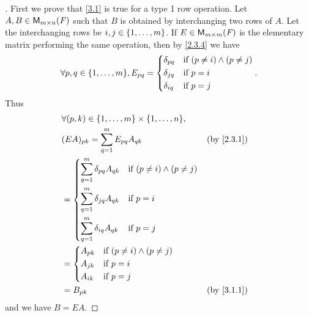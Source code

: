 \begin{proof}[]
	First we prove that \cref{3.1} is true for a type 1 row operation.
	Let \(A, B \in \mathsf{M}_{{m} \times n}({\mathit{F}})\) such that \(B\) is obtained by interchanging two rows of \(A\).
	Let the interchanging rows be \(i, j \in \left\lbrace1, \dots, m\right\rbrace\).
	If \(E \in \mathsf{M}_{{m} \times m}({\mathit{F}})\) is the elementary matrix performing the same operation, then by \cref{2.3.4} we have
	\[
		\forall p, q \in \set{1, \dots, m}, E_{p q} = \begin{dcases}
			\delta_{p q} & \text{if } (p \neq i) \land (p \neq j) \\
			\delta_{j q} & \text{if } p = i                       \\
			\delta_{i q} & \text{if } p = j
		\end{dcases}.
	\]
	Thus
	\begin{align*}
		 & \forall (p, k) \in \set{1, \dots, m} \times \set{1, \dots, n},                                  \\
		 & (EA)_{p k} = \sum_{q = 1}^m E_{p q} A_{q k}                                     &  & \by{2.3.1} \\
		 & = \begin{dcases}
			     \sum_{q = 1}^m \delta_{p q} A_{q k} & \text{if } (p \neq i) \land (p \neq j) \\
			     \sum_{q = 1}^m \delta_{j q} A_{q k} & \text{if } p = i                       \\
			     \sum_{q = 1}^m \delta_{i q} A_{q k} & \text{if } p = j
		     \end{dcases}                  \\
		 & = \begin{dcases}
			     A_{p k} & \text{if } (p \neq i) \land (p \neq j) \\
			     A_{j k} & \text{if } p = i                       \\
			     A_{i k} & \text{if } p = j
		     \end{dcases}                                              \\
		 & = B_{p k}                                                                       &  & \by{3.1.1}
	\end{align*}
	and we have \(B = EA\).


\end{proof}
